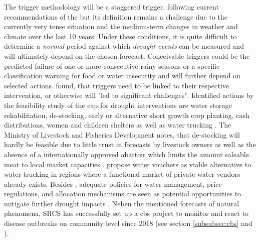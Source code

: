 The trigger methodology will be a staggered trigger, following current recommendations of the \autocite{rcrcFORECASTBASEDFINANCINGEARLY2020} but its definition remains a challenge due to the currently very tense situation and the medium-term changes in weather and climate over the last 10 years. Under these conditions, it is quite difficult to determine a \textit{normal} period against which \textit{drought events} can be measured and will ultimately depend on the chosen forecast. Conceivable triggers could be the predicted failure of one or more consecutive rainy seasons or a specific classification warning for food or water insecurity and will further depend on selected actions. \autocite[19]{gettliffeOCHAAnticipatoryAction2021} found, that triggers need to be linked to their respective intervention, or otherwise will "led to significant challenges".\newline
Identified actions by the feasibility study of the \acrshort{eap} for drought interventions are water storage rehabilitation, de-stocking, early or alternative short growth crop planting, cash distributions, women and children shelters as well as water trucking \autocite{scrsFeasibilityStudyPotential2022}. The Ministry of Livestock and Fisheries Development notes, that de-stocking will hardly be feasible due to little trust in forecasts by livestock owners as well as the absence of a internationally approved abattoir which limits the amount saleable meat to local market capacities \autocite{scrsFeasibilityStudyPotential2022}. \autocite{gualazziniEWEAEarlyWarning2021} propose water vouchers as viable alternative to water trucking in regions where a functional market of private water vendors already exists. Besides , adequate policies for water management, price regulations, and allocation mechanisms are seen as potential opportunities to mitigate further drought impacts \autocite{gualazziniEWEAEarlyWarning2021,wangPropagationDroughtMeteorological2016}.\newline
Neben the mentioned forecasts of natural phenomena, SRCS has successfully set up a \acrshort{cbs} project to monitor and react to disease outbreaks on community level since 2018 (see section \ref{subsubsec:cbs} and \autocite{jungCommunityBasedSurveillance2022}). 

